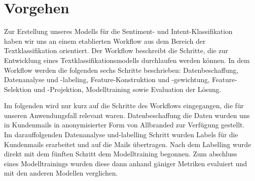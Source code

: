 \chapter{Vorgehen}

Zur Erstellung unseres Modells für die Sentiment- und Intent-Klassifikation haben wir uns an 
einem etablierten Workflow aus dem Bereich der Textklassifikation orientiert. Der Workflow 
beschreibt die Schritte, die zur Entwicklung eines Textklassifikationsmodells durchlaufen werden 
können. In dem Workflow werden die folgenden sechs Schritte beschrieben:  Datenbeschaffung, Datenanalyse 
und -labeling, Feature-Konstruktion und -gewichtung, Feature-Selektion und -Projektion,  Modelltraining 
sowie Evaluation der Lösung. \cite{Mirończuk}

Im folgenden wird nur kurz auf die Schritte des Workflows eingegangen, die für 
unseren Anwendungsfall relevant waren. Datenbeschaffung die Daten wurden uns in Kundenmails in anonymisierter 
Form von Allbranded zur Verfügung gestellt. Im darauffolgenden Datenanalyse und-labelling Schritt wurden Labels 
für die Kundenmails erarbeitet und auf die Mails übertragen. Nach dem Labelling wurde direkt mit dem fünften 
Schritt dem Modelltraining begonnen. Zum abschluss eines Modelltrainings wurden diese dann anhand gäniger
Metriken evaluiert und mit den anderen Modellen verglichen. \cite{Mirończuk}


